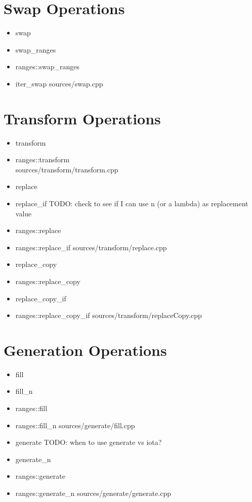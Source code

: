 \documentclass{article}
\begin{document}
\section{Swap Operations}
    \begin{itemize}
      \item swap
      \item swap\_ranges
      \item ranges::swap\_ranges
      \item iter\_swap
         {sources/swap.cpp}
    \end{itemize}
\section{Transform Operations}
    \begin{itemize}
      \item transform
      \item ranges::transform \\
         {sources/transform/transform.cpp}
      \item replace
      \item replace\_if TODO: check to see if I can use n (or a lambda) as replacement value
      \item ranges::replace
      \item ranges::replace\_if
         {sources/transform/replace.cpp}
      \item replace\_copy
      \item ranges::replace\_copy
      \item replace\_copy\_if
      \item ranges::replace\_copy\_if
         {sources/transform/replaceCopy.cpp}
    \end{itemize}
\section{Generation Operations}
    \begin{itemize}
      \item fill
      \item fill\_n
      \item ranges::fill
      \item ranges::fill\_n
         {sources/generate/fill.cpp}
      \item generate TODO: when to use generate vs iota?
      \item generate\_n
      \item ranges::generate
      \item ranges::generate\_n
         {sources/generate/generate.cpp}
    \end{itemize}
\end{document}
